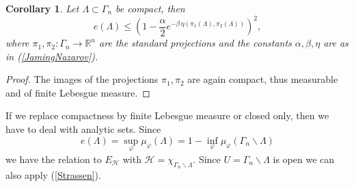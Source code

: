 \documentclass[12pt,a4paper]{article}
\newcommand{\RR}[1]{\mathbb{R}^#1}
\newcommand{\HH}{\mathcal{H}}
\newtheorem{corollary}{Corollary}
\begin{document}
\begin{corollary}\label{corollary_e}
Let $\Lambda\subset\Gamma_n$ be compact, then
\begin{equation}
             e(\Lambda) \leq 
      \left( 1-\frac{\alpha}{2} e^{-\beta\, 
          \eta(\pi_1(\Lambda),\pi_2(\Lambda))} \right)^2,
\end{equation}
where $\pi_1,\pi_2:\Gamma_n \rightarrow {\RR n}$ are the standard projections
and the constants $\alpha,\beta,\eta$ are as in (\ref{JamingNazarov}). 
\end{corollary}

\begin{proof}
The images of the projections $\pi_1,\pi_2$ are again compact, thus measurable
and of finite Lebesgue measure. 
\end{proof}
\rm
If we replace compactness by finite Lebesgue measure or closed only, then
we have to deal with analytic sets. 
Since 
\begin{displaymath}
    e(\Lambda)=\sup_{\varphi} \mu_{\varphi}(\Lambda)=
      1-\inf_{\varphi} \mu_{\varphi}(\Gamma_n\backslash\Lambda)
\end{displaymath}
we have the relation to $E_\HH$ with $\HH=\chi_{\Gamma_n\backslash\Lambda}$. Since
$U=\Gamma_n\backslash\Lambda$ is open we can also apply (\ref{Strassen}). 
\end{document}
